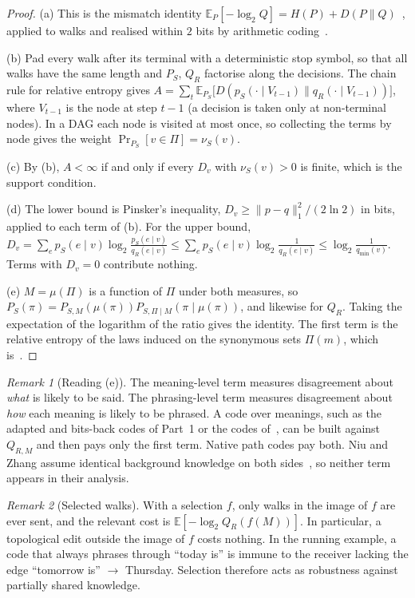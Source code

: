 \documentclass[11pt]{article}
\theoremstyle{definition}
\theoremstyle{remark}
\newtheorem{remark}{Remark}
\newcommand{\Pset}{\Pi}
\newcommand{\E}{\mathbb{E}}
\newcommand{\D}{D}
\begin{document}
\begin{proof}
(a) This is the mismatch identity $\E_P[-\log_2Q]=H(P)+\D(P\|Q)$~\cite{cover2006}, applied to walks and realised within $2$ bits by arithmetic coding~\cite{rissanen1979}.

(b) Pad every walk after its terminal with a deterministic stop symbol, so that all walks have the same length and $P_S$, $Q_R$ factorise along the decisions. The chain rule for relative entropy gives $A=\sum_{t}\E_{P_S}\bigl[\D(p_S(\cdot\mid V_{t-1})\|q_R(\cdot\mid V_{t-1}))\bigr]$, where $V_{t-1}$ is the node at step $t-1$ (a decision is taken only at non-terminal nodes). In a DAG each node is visited at most once, so collecting the terms by node gives the weight $\Pr_{P_S}[v\in\Pi]=\nu_S(v)$.

(c) By (b), $A<\infty$ if and only if every $D_v$ with $\nu_S(v)>0$ is finite, which is the support condition.

(d) The lower bound is Pinsker's inequality, $D_v\ge\|p-q\|_1^2/(2\ln2)$ in bits, applied to each term of (b). For the upper bound, $D_v=\sum_ep_S(e\mid v)\log_2\frac{p_S(e\mid v)}{q_R(e\mid v)}\le\sum_ep_S(e\mid v)\log_2\frac{1}{q_R(e\mid v)}\le\log_2\frac{1}{q_{\min}(v)}$. Terms with $D_v=0$ contribute nothing.

(e) $M=\mu(\Pi)$ is a function of $\Pi$ under both measures, so $P_S(\pi)=P_{S,M}(\mu(\pi))P_{S,\Pi\mid M}(\pi\mid\mu(\pi))$, and likewise for $Q_R$. Taking the expectation of the logarithm of the ratio gives the identity. The first term is the relative entropy of the laws induced on the synonymous sets $\Pset(m)$, which is~\cite[Eq.~(4.1)]{niu2025}.
\end{proof}

\begin{remark}[Reading (e)]
The meaning-level term measures disagreement about \emph{what} is likely to be said. The phrasing-level term measures disagreement about \emph{how} each meaning is likely to be phrased. A code over meanings, such as the adapted and bits-back codes of Part~1 or the codes of~\cite{niu2025,liang2025}, can be built against $Q_{R,M}$ and then pays only the first term. Native path codes pay both. Niu and Zhang assume identical background knowledge on both sides~\cite[\S2.2]{niu2025}, so neither term appears in their analysis.
\end{remark}

\begin{remark}[Selected walks]\label{rem:selection}
With a selection $f$, only walks in the image of $f$ are ever sent, and the relevant cost is $\E[-\log_2Q_R(f(M))]$. In particular, a topological edit outside the image of $f$ costs nothing. In the running example, a code that always phrases through ``today is'' is immune to the receiver lacking the edge ``tomorrow is'' $\to$ Thursday. Selection therefore acts as robustness against partially shared knowledge.
\end{remark}
\end{document}
